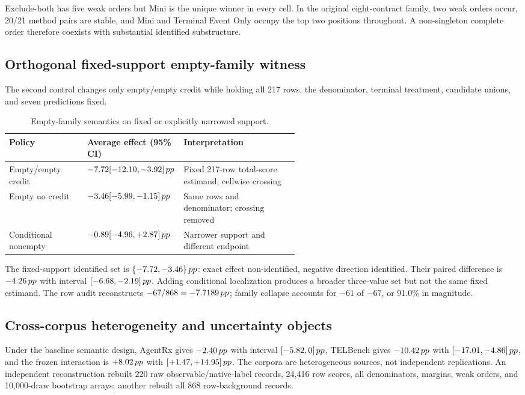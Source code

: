 Exclude-both has five weak orders but Mini is the unique winner in every cell.  In the original eight-contract family, two weak orders occur, 20/21 method pairs are stable, and Mini and Terminal Event Only occupy the top two positions throughout.  A non-singleton complete order therefore coexists with substantial identified substructure.

\subsection{Orthogonal fixed-support empty-family witness}

The second control changes only empty/empty credit while holding all 217 rows, the denominator, terminal treatment, candidate unions, and seven predictions fixed.

\begin{table}[ht]
\centering
\caption{Empty-family semantics on fixed or explicitly narrowed support.}
\label{tab:legacy-empty-family}
\begin{tabularx}{\linewidth}{@{}p{0.27\linewidth}p{0.29\linewidth}Y@{}}
\toprule Policy & Average effect (95\% CI) & Interpretation \\
\midrule
Empty/empty credit & \(-7.72[-12.10,-3.92]\,pp\) & Fixed 217-row total-score estimand; cellwise crossing \\
Empty no credit & \(-3.46[-5.99,-1.15]\,pp\) & Same rows and denominator; crossing removed \\
Conditional nonempty & \(-0.89[-4.96,+2.87]\,pp\) & Narrower support and different endpoint \\
\bottomrule
\end{tabularx}
\end{table}

The fixed-support identified set is \(\{-7.72,-3.46\}\,pp\): exact effect non-identified, negative direction identified.  Their paired difference is \(-4.26\,pp\) with interval \([-6.68,-2.19]\,pp\).  Adding conditional localization produces a broader three-value set but not the same fixed estimand.  The row audit reconstructs \(-67/868=-7.7189\,pp\); family collapse accounts for \(-61\) of \(-67\), or 91.0\% in magnitude.

\subsection{Cross-corpus heterogeneity and uncertainty objects}

Under the baseline semantic design, AgentRx gives \(-2.40\,pp\) with interval \([-5.82,0]\,pp\), TELBench gives \(-10.42\,pp\) with \([-17.01,-4.86]\,pp\), and the frozen interaction is \(+8.02\,pp\) with \([+1.47,+14.95]\,pp\).  The corpora are heterogeneous sources, not independent replications.  An independent reconstruction rebuilt 220 raw observable/native-label records, 24,416 row scores, all denominators, margins, weak orders, and 10,000-draw bootstrap arrays; another rebuilt all 868 row-background records.

